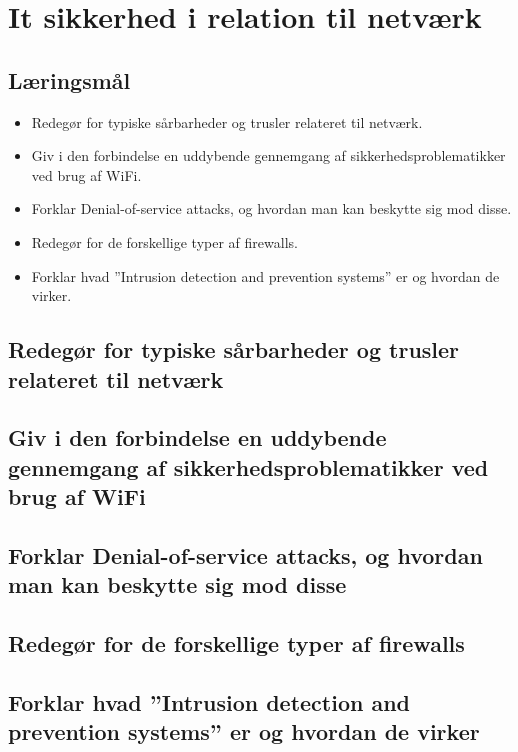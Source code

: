 \section{It sikkerhed i relation til netværk}

\subsection{Læringsmål}

\begin{itemize}
	\item Redegør for typiske sårbarheder og trusler relateret til netværk.
	\item Giv i den forbindelse en uddybende gennemgang af sikkerhedsproblematikker ved	brug af WiFi.
	\item Forklar Denial-of-service attacks, og hvordan man kan beskytte sig mod disse.
	\item Redegør for de forskellige typer af firewalls.
	\item Forklar hvad ”Intrusion detection and prevention systems” er og hvordan de virker.
\end{itemize}

\subsection{Redegør for typiske sårbarheder og trusler relateret til netværk}
\subsection{Giv i den forbindelse en uddybende gennemgang af sikkerhedsproblematikker ved brug af WiFi}
\subsection{Forklar Denial-of-service attacks, og hvordan man kan beskytte sig mod disse}
\subsection{Redegør for de forskellige typer af firewalls}
\subsection{Forklar hvad ”Intrusion detection and prevention systems” er og hvordan de virker}
